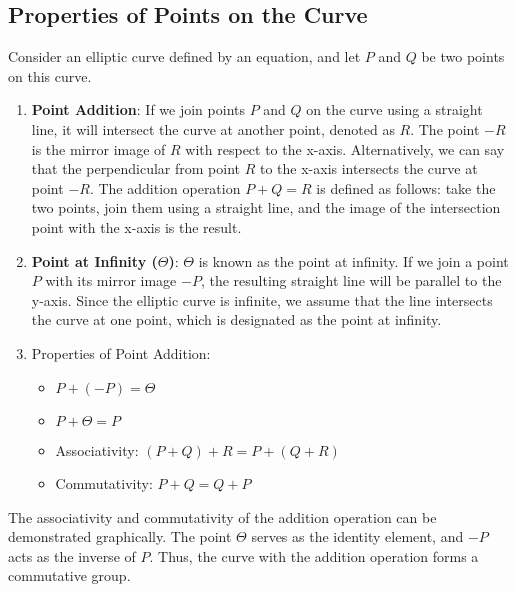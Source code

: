 \documentclass[11pt]{article}
\begin{document}
\subsection{Properties of Points on the Curve}

Consider an elliptic curve defined by an equation, and let \( P \) and \( Q \) be two points on this curve.

\begin{enumerate}
    \item \textbf{Point Addition}: If we join points \( P \) and \( Q \) on the curve using a straight line, it will intersect the curve at another point, denoted as \( R \). The point \( -R \) is the mirror image of \( R \) with respect to the x-axis. Alternatively, we can say that the perpendicular from point \( R \) to the x-axis intersects the curve at point \( -R \). The addition operation \( P + Q = R \) is defined as follows: take the two points, join them using a straight line, and the image of the intersection point with the x-axis is the result.
    
    \item \textbf{Point at Infinity (\( \Theta \))}: \( \Theta \) is known as the point at infinity. If we join a point \( P \) with its mirror image \( -P \), the resulting straight line will be parallel to the y-axis. Since the elliptic curve is infinite, we assume that the line intersects the curve at one point, which is designated as the point at infinity.
    
    \item Properties of Point Addition:
    \begin{itemize}
        \item \( P + (-P) = \Theta \)
        \item \( P + \Theta = P \)
        \item Associativity: \( (P + Q) + R = P + (Q + R) \)
        \item Commutativity: \( P + Q = Q + P \)
    \end{itemize}
\end{enumerate}

The associativity and commutativity of the addition operation can be demonstrated graphically. The point \( \Theta \) serves as the identity element, and \( -P \) acts as the inverse of \( P \). Thus, the curve with the addition operation forms a commutative group.
\end{document}
